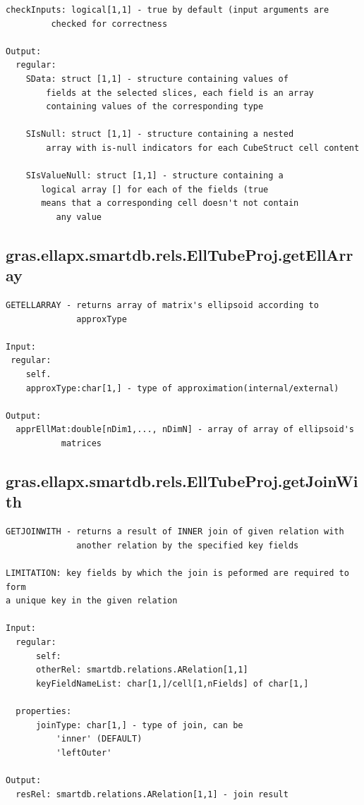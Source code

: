 \documentclass[letterpaper,10pt,english]{sphinxmanual}
\begin{document}
\begin{Verbatim}[commandchars=\\\{\}]
      checkInputs: logical[1,1] - true by default (input arguments are
         checked for correctness

Output:
  regular:
    SData: struct [1,1] - structure containing values of
        fields at the selected slices, each field is an array
        containing values of the corresponding type

    SIsNull: struct [1,1] - structure containing a nested
        array with is-null indicators for each CubeStruct cell content

    SIsValueNull: struct [1,1] - structure containing a
       logical array [] for each of the fields (true
       means that a corresponding cell doesn't not contain
          any value
\end{Verbatim}


\subsection{gras.ellapx.smartdb.rels.EllTubeProj.getEllArray}
\label{chap_functions:gras-ellapx-smartdb-rels-elltubeproj-getellarray}
\begin{Verbatim}[commandchars=\\\{\}]
GETELLARRAY - returns array of matrix's ellipsoid according to
              approxType

Input:
 regular:
    self.
    approxType:char[1,] - type of approximation(internal/external)

Output:
  apprEllMat:double[nDim1,..., nDimN] - array of array of ellipsoid's
           matrices
\end{Verbatim}


\subsection{gras.ellapx.smartdb.rels.EllTubeProj.getJoinWith}
\label{chap_functions:gras-ellapx-smartdb-rels-elltubeproj-getjoinwith}
\begin{Verbatim}[commandchars=\\\{\}]
GETJOINWITH - returns a result of INNER join of given relation with
              another relation by the specified key fields

LIMITATION: key fields by which the join is peformed are required to form
a unique key in the given relation

Input:
  regular:
      self:
      otherRel: smartdb.relations.ARelation[1,1]
      keyFieldNameList: char[1,]/cell[1,nFields] of char[1,]

  properties:
      joinType: char[1,] - type of join, can be
          'inner' (DEFAULT)
          'leftOuter'

Output:
  resRel: smartdb.relations.ARelation[1,1] - join result
\end{Verbatim}
\end{document}
